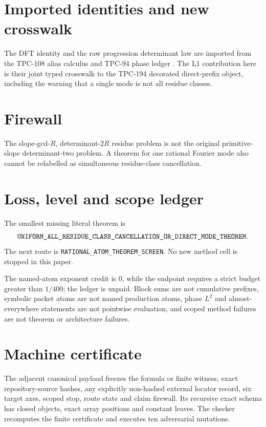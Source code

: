 \documentclass[11pt]{article}
\begin{document}
\section{Imported identities and new crosswalk}
The DFT identity and the raw progression determinant law are imported from
the TPC-108 alias calculus and TPC-94 phase ledger
\citep{WangTPC94,WangTPC108}.  The L1 contribution here is their joint typed
crosswalk to the TPC-194 decorated direct-prefix object, including the
warning that a single mode is not all residue classes.

\section{Firewall}
The slope-gcd-\(R\), determinant-\(2R\) residue problem is not the original
primitive-slope determinant-two problem.  A theorem for one rational
Fourier mode also cannot be relabelled as simultaneous residue-class
cancellation.


\section{Loss, level and scope ledger}
The smallest missing literal theorem is
\[
\texttt{UNIFORM\_\allowbreak{}ALL\_\allowbreak{}RESIDUE\_\allowbreak{}CLASS\_\allowbreak{}CANCELLATION\_\allowbreak{}OR\_\allowbreak{}DIRECT\_\allowbreak{}MODE\_\allowbreak{}THEOREM}.
\]
The next route is \texttt{RATIONAL\_\allowbreak{}ATOM\_\allowbreak{}THEOREM\_\allowbreak{}SCREEN}.
No new method cell is stopped in this paper.

The named-atom exponent credit is \(0\), while the endpoint requires a
strict budget greater than \(1/400\); the ledger is unpaid.  Block sums are
not cumulative prefixes, symbolic packet atoms are not named production
atoms, phase \(L^2\) and almost-everywhere statements are not pointwise
evaluation, and scoped method failures are not theorem or architecture
failures.

\section{Machine certificate}
The adjacent canonical payload freezes the formula or finite witness,
exact repository-source hashes, any explicitly non-hashed external locator
record, six target axes, scoped stop, route state and claim firewall.  Its
recursive exact schema has closed objects, exact array positions and
constant leaves.  The checker recomputes the finite certificate and executes
ten adversarial mutations.



\end{document}
